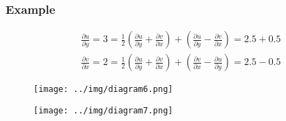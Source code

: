 \documentclass[class=report, crop=false, 12pt,a4paper]{standalone}
\begin{document}
\subsubsection{Example}
\begin{gather}
  \frac{\partial u}{\partial y}=3=\frac{1}{2} \left(\frac{\partial u}{\partial y} + \frac{\partial v}{\partial x}\right) + \left(\frac{\partial u}{\partial y} - \frac{\partial v}{\partial x}\right) = 2.5 + 0.5\\
  \frac{\partial v}{\partial x}=2=\frac{1}{2} \left(\frac{\partial u}{\partial y} + \frac{\partial v}{\partial x}\right) + \left(\frac{\partial v}{\partial x} - \frac{\partial u}{\partial y}\right) = 2.5 - 0.5
\end{gather}
\begin{figure}[H]
  \centering
  \texttt{[image: ../img/diagram6.png]}
\end{figure}
\begin{figure}[H]
  \centering
  \texttt{[image: ../img/diagram7.png]}
\end{figure}
\end{document}
